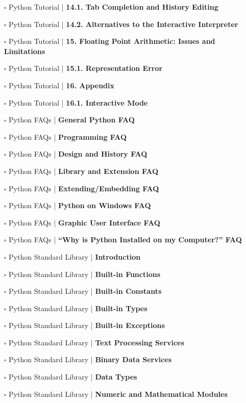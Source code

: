 \documentclass[a4, landscape, 12pt]{article}
\newcommand{\checkbox}{$\square$}%
\begin{document}
\begin{itemize}
{}
\item [\checkbox]  Python Tutorial | \textbf{ 14.1. Tab Completion and History Editing
}
\item [\checkbox]  Python Tutorial | \textbf{ 14.2. Alternatives to the Interactive Interpreter
}
\item [\checkbox]  Python Tutorial | \textbf{ 15. Floating Point Arithmetic: Issues and Limitations
}
\item [\checkbox]  Python Tutorial | \textbf{ 15.1. Representation Error
}
\item [\checkbox]  Python Tutorial | \textbf{ 16. Appendix
}
\item [\checkbox]  Python Tutorial | \textbf{ 16.1. Interactive Mode
}
\item [\checkbox]  Python FAQs | \textbf{ General Python FAQ
}
\item [\checkbox]  Python FAQs | \textbf{ Programming FAQ
}
\item [\checkbox]  Python FAQs | \textbf{ Design and History FAQ
}
\item [\checkbox]  Python FAQs | \textbf{ Library and Extension FAQ
}
\item [\checkbox]  Python FAQs | \textbf{ Extending/Embedding FAQ
}
\item [\checkbox]  Python FAQs | \textbf{ Python on Windows FAQ
}
\item [\checkbox]  Python FAQs | \textbf{ Graphic User Interface FAQ
}
\item [\checkbox]  Python FAQs | \textbf{ “Why is Python Installed on my Computer?” FAQ
}
\item [\checkbox]  Python Standard Library | \textbf{ Introduction
}
\item [\checkbox]  Python Standard Library | \textbf{ Built-in Functions
}
\item [\checkbox]  Python Standard Library | \textbf{ Built-in Constants
}
\item [\checkbox]  Python Standard Library | \textbf{ Built-in Types
}
\item [\checkbox]  Python Standard Library | \textbf{ Built-in Exceptions
}
\item [\checkbox]  Python Standard Library | \textbf{ Text Processing Services
}
\item [\checkbox]  Python Standard Library | \textbf{ Binary Data Services
}
\item [\checkbox]  Python Standard Library | \textbf{ Data Types
}
\item [\checkbox]  Python Standard Library | \textbf{ Numeric and Mathematical Modules
}
\end{itemize}
\end{document}
